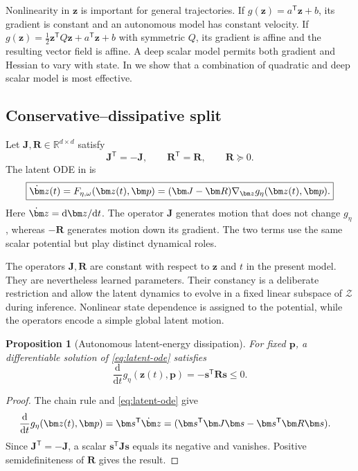 \documentclass[a4paper,11pt]{article}
\newtheorem{proposition}{Proposition}
\newcommand{\R}{\mathbb{R}}
\newcommand{\z}{\bm z}
\newcommand{\p}{\bm p}
\newcommand{\s}{\bm s}
\newcommand{\Jop}{\bm J}
\newcommand{\Rop}{\bm R}
\newcommand{\Genergy}{g_{\eta}}
\begin{document}
Nonlinearity in $\z$ is important for general trajectories. If $g(\z)=a^{\mathsf T}\z+b$, its gradient is constant and an autonomous model has constant velocity. If $g(\z)=\tfrac12\z^{\mathsf T}Q\z+a^{\mathsf T}\z+b$ with symmetric $Q$, its gradient is affine and the resulting vector field is affine. A deep scalar model permits both gradient and Hessian to vary with state. In  we show that a combination of quadratic and deep scalar model is most effective.

\subsection{Conservative--dissipative split}
Let $\Jop,\Rop\in\R^{d\times d}$ satisfy
\begin{equation}
 \Jop^{\mathsf T}=-\Jop,\qquad \Rop^{\mathsf T}=\Rop,\qquad \Rop\succeq0.
 \label{eq:operator-conditions}
\end{equation}
The latent ODE in  is
\begin{equation}
  \boxed{
  \dot\z(t)
  =F_{\eta,\omega}(\z(t),\p)
  =(\Jop-\Rop)\nabla_{\z}g_\eta(\z(t),\p).
  }
  \label{eq:latent-ode}
\end{equation}
Here $\dot\z=\mathrm d\z/\mathrm dt$. The operator $\Jop$ generates motion
that does not change $g_\eta$, whereas $-\Rop$ generates motion down its
gradient. The two terms use the same scalar potential but play distinct
dynamical roles.

The operators $\Jop, \Rop$ are constant with respect to $\z$ and $t$ in the present model.
They are nevertheless learned parameters. Their constancy is a deliberate
restriction and allow the latent dynamics to evolve in a fixed linear subspace of $\mathcal{Z}$ during inference. 
Nonlinear state dependence is assigned to the potential, while
the operators encode a simple global latent motion. 

\begin{proposition}[Autonomous latent-energy dissipation]
For fixed $\p$, a differentiable solution of \eqref{eq:latent-ode} satisfies
\begin{equation}
 \frac{\mathrm d}{\mathrm dt}\Genergy(\z(t),\p)=-\s^{\mathsf T}\Rop\s\leq0.
 \label{eq:dissipation}
\end{equation}
\end{proposition}
\begin{proof}
The chain rule and \eqref{eq:latent-ode} give
\begin{align}
 \frac{\mathrm d}{\mathrm dt}\Genergy(\z(t),\p)
 &=\s^{\mathsf T}\dot\z
 =(\s^{\mathsf T}\Jop\s-\s^{\mathsf T}\Rop\s).
\end{align}
Since $\Jop^{\mathsf T}=-\Jop$, a scalar $\s^{\mathsf T}\Jop\s$ equals its negative and vanishes. Positive semidefiniteness of $\Rop$ gives the result.
\end{proof}
\end{document}
